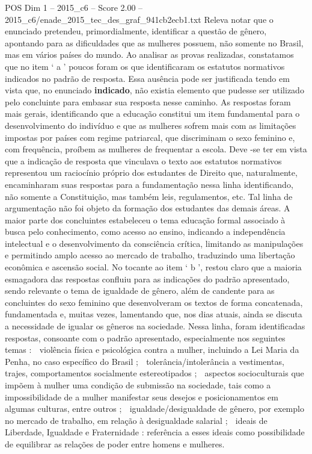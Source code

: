 \begin{textsample}{POS Dim 1 – 2015\_c6 – Score 2.00 – 2015\_c6/enade\_2015\_tec\_des\_graf\_941cb2ecb1.txt}
Releva notar que o enunciado pretendeu, primordialmente, identificar a questão de gênero, apontando para as dificuldades que as mulheres possuem, não somente no Brasil, mas em vários países do mundo.
Ao analisar as provas realizadas, constatamos que no item ‘ a ’ poucos foram os que identificaram os estatutos normativos indicados no padrão de resposta.
Essa ausência pode ser justificada tendo em vista que, no enunciado \textbf{indicado}, não existia elemento que pudesse ser utilizado pelo concluinte para embasar sua resposta nesse caminho.
As respostas foram mais gerais, identificando que a educação constitui um item fundamental para o desenvolvimento do indivíduo e que as mulheres sofrem mais com as limitações impostas por países com regime patriarcal, que discriminam o sexo feminino e, com frequência, proíbem as mulheres de frequentar a escola.
Deve -se ter em vista que a indicação de resposta que vinculava o texto aos estatutos normativos representou um raciocínio próprio dos estudantes de Direito que, naturalmente, encaminharam suas respostas para a fundamentação nessa linha identificando, não somente a Constituição, mas também leis, regulamentos, etc.
Tal linha de argumentação não foi objeto da formação dos estudantes das demais áreas.
A maior parte dos concluintes estabeleceu o tema educação formal associado à busca pelo conhecimento, como acesso ao ensino, indicando a independência intelectual e o desenvolvimento da consciência crítica, limitando as manipulações e permitindo amplo acesso ao mercado de trabalho, traduzindo uma libertação econômica e ascensão social.
No tocante ao item ‘ b ’, restou claro que a maioria esmagadora das respostas confluiu para as indicações do padrão apresentado, sendo relevante o tema de igualdade de gênero, além de candente para as concluintes do sexo feminino que desenvolveram os textos de forma concatenada, fundamentada e, muitas vezes, lamentando que, nos dias atuais, ainda se discuta a necessidade de igualar os gêneros na sociedade.
Nessa linha, foram identificadas respostas, consoante com o padrão apresentado, especialmente nos seguintes temas :  violência física e psicológica contra a mulher, incluindo a Lei Maria da Penha, no caso específico do Brasil ;  tolerância/intolerância a vestimentas, trajes, comportamentos socialmente estereotipados ;  aspectos socioculturais que impõem à mulher uma condição de submissão na sociedade, tais como a impossibilidade de a mulher manifestar seus desejos e posicionamentos em algumas culturas, entre outros ;  igualdade/desigualdade de gênero, por exemplo no mercado de trabalho, em relação à desigualdade salarial ;  ideais de Liberdade, Igualdade e Fraternidade : referência a esses ideais como possibilidade de equilibrar as relações de poder entre homens e mulheres.

\end{textsample}
